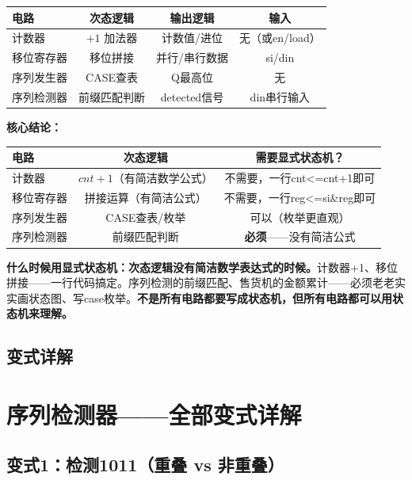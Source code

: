 \begin{center}
\begin{tabular}{|l|c|c|c|}
\hline
\textbf{电路} & \textbf{次态逻辑} & \textbf{输出逻辑} & \textbf{输入} \\
\hline
计数器 & $+1$ 加法器 & 计数值/进位 & 无（或en/load）\\
移位寄存器 & 移位拼接 & 并行/串行数据 & si/din \\
序列发生器 & CASE查表 & Q最高位 & 无 \\
序列检测器 & 前缀匹配判断 & detected信号 & din串行输入 \\
\hline
\end{tabular}
\end{center}

\textbf{核心结论：}

\begin{center}
\begin{tabular}{|l|c|c|}
\hline
\textbf{电路} & \textbf{次态逻辑} & \textbf{需要显式状态机？} \\
\hline
计数器 & $cnt+1$（有简洁数学公式）& 不需要，一行cnt<=cnt+1即可 \\
移位寄存器 & 拼接运算（有简洁公式）& 不需要，一行reg<=si\&reg即可 \\
序列发生器 & CASE查表/枚举 & 可以（枚举更直观）\\
序列检测器 & 前缀匹配判断 & \textbf{必须}——没有简洁公式 \\
\hline
\end{tabular}
\end{center}

\textbf{什么时候用显式状态机：次态逻辑没有简洁数学表达式的时候。}计数器+1、移位拼接——一行代码搞定。序列检测的前缀匹配、售货机的金额累计——必须老老实实画状态图、写case枚举。\textbf{不是所有电路都要写成状态机，但所有电路都可以用状态机来理解。}

\section{变式详解}
\chapter{序列检测器——全部变式详解}

\section{变式1：检测1011（重叠 vs 非重叠）}

